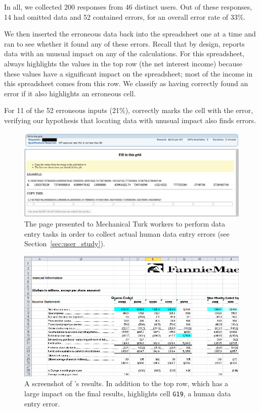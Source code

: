 In all, we collected 200 responses from 46 distinct users. Out of
these responses, 14 had omitted data and 52 contained errors, for an
overall error rate of 33\%.

We then inserted the erroneous data back into the spreadsheet one at a
time and ran \checkcell{} to see whether it found any of these
errors. Recall that by design, \checkcell{} reports data with an
unusual impact on any of the calculations. For this
spreadsheet, \checkcell{} always highlights the values in the top row
(the net interest income) because these values have a significant
impact on the spreadsheet; most of the income in this spreadsheet
comes from this row. We classify \checkcell{} as having correctly
found an error if it also highlights an erroneous cell.

For 11 of the 52 erroneous inputs (21\%), \checkcell{} correctly marks the
cell with the error, verifying our hypothesis that locating data with
unusual impact also finds errors.


\begin{figure}[!t]
\centering
\includegraphics[width=5.5in]{images/mturk_fuzz_task}
  \caption{The page presented to Mechanical Turk workers to perform data entry tasks in order to collect actual human data entry errors (see Section~\ref{sec:user_study}).\label{fig:mturk_task}}
\end{figure}


\begin{figure}[!t]
\centering
\includegraphics[width=5.5in]{images/fannie_mae_outlier}
  \caption{A screenshot of \checkcell{}'s results. In addition to the top row, which has a large impact on the final results, \checkcell{} highlights cell \texttt{G19}, a human data entry error.\label{fig:fannie_mae}}
\end{figure}


